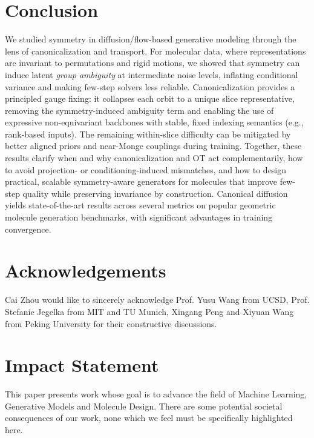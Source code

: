 \documentclass{article}
\theoremstyle{plain}
\theoremstyle{definition}
\theoremstyle{remark}
\newcommand{\1}{\mathbf{1}}
\begin{document}
\section{Conclusion}
We studied symmetry in diffusion/flow-based generative modeling through the lens of canonicalization and transport. For molecular data, where representations are invariant to permutations and rigid motions, we showed that symmetry can induce latent \emph{group ambiguity} at intermediate noise levels, inflating conditional variance and making few-step solvers less reliable. Canonicalization provides a principled gauge fixing: it collapses each orbit to a unique slice representative, removing the symmetry-induced ambiguity term and enabling the use of expressive non-equivariant backbones with stable, fixed indexing semantics (e.g., rank-based inputs). The remaining within-slice  difficulty can be mitigated by better aligned priors and near-Monge couplings during training. Together, these results clarify when and why canonicalization and OT act complementarily, how to avoid projection- or conditioning-induced mismatches, and how to design practical, scalable symmetry-aware generators for molecules that improve few-step quality while preserving invariance by construction. Canonical diffusion yields state-of-the-art results across several metrics on popular geometric molecule generation benchmarks, with significant advantages in training convergence.

\section*{Acknowledgements}

Cai Zhou would like to sincerely acknowledge Prof. Yusu Wang from UCSD, Prof. Stefanie Jegelka from MIT and TU Munich, Xingang Peng and Xiyuan Wang from Peking University for their constructive discussions.

\section*{Impact Statement}
This paper presents work whose goal is to advance the field of Machine Learning, Generative Models and Molecule Design. There are some potential societal consequences of our work, none which we feel must be specifically highlighted here.




\newpage
\appendix
\onecolumn
\end{document}
